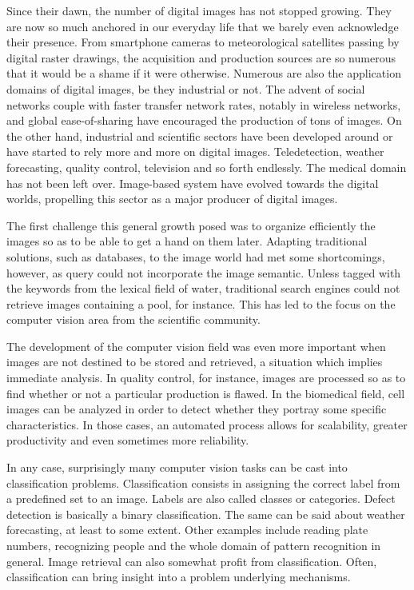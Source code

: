 \documentclass[a4paper]{report}
\begin{document}
Since their dawn, the number of digital images has not stopped growing. They are now so much anchored in our everyday life that we barely even acknowledge their presence. From smartphone cameras to  meteorological satellites passing by digital raster drawings, the acquisition and production sources are so numerous that it would be a shame if it were otherwise. Numerous are also the application domains of digital images, be they industrial or not. The advent of social networks couple with faster transfer network rates, notably in wireless networks, and global ease-of-sharing have encouraged the production of tons of images. On the other hand, industrial and scientific sectors have been developed around or have started to rely more and more on digital images. Teledetection, weather forecasting, quality control, television and so forth endlessly. The medical domain has not been left over. Image-based system have evolved towards the digital worlds, propelling this sector as a major producer of digital images.
\par
The first challenge this general growth posed was to organize efficiently the images so as to be able to get a hand on them later. Adapting traditional solutions, such as databases, to the image world had met some shortcomings, however, as query could not incorporate the image semantic. Unless tagged with the keywords from the lexical field of water, traditional search engines could not retrieve images containing a pool, for instance. This has led to the focus on the computer vision area from the scientific community.
\par
The development of the computer vision field was even more important when images are not destined to be stored and retrieved, a situation which implies immediate analysis. In quality control, for instance, images are processed so as to find whether or not a particular production is flawed. In the biomedical field, cell images can be analyzed in order to detect whether they portray some specific characteristics. In those cases, an automated process allows for scalability, greater productivity and even sometimes more reliability.
\par
In any case, surprisingly many computer vision tasks can be cast into classification problems. Classification consists in assigning the correct label from a predefined set to an image. Labels are also called classes or categories. Defect detection is basically a binary classification. The same can be said about weather forecasting, at least to some extent. Other examples include reading plate numbers, recognizing people and the whole domain of pattern recognition in general.
Image retrieval can also somewhat profit from classification. Often, classification can bring insight into a problem underlying mechanisms.
\end{document}
